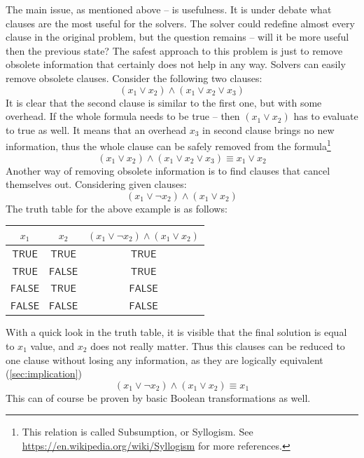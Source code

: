 \documentclass[12pt,english,pdflatex]{aghdpl}
\begin{document}
The main issue, as mentioned above -- is usefulness. It is under debate
what clauses are the most useful for the solvers. The solver could redefine
almost every clause in the original problem, but the question remains
-- will it be more useful then the previous state? The safest approach
to this problem is just to remove obsolete information that certainly
does not help in any way. Solvers can easily remove obsolete clauses.
Consider the following two clauses:
\begin{equation}
(x_1 \vee x_2)\wedge(x_1\vee x_2\vee x_3)
\end{equation}
It is clear that the second clause is similar to the first one, but with some
overhead. If the whole formula needs to be true -- then $(x_1 \vee x_2)$ has to evaluate to true as well. It means that an overhead $x_3$ in second clause brings no new information,
thus the whole clause can be safely removed from the formula\footnote{This relation is called Subsumption, or Syllogism. See \url{https://en.wikipedia.org/wiki/Syllogism} for more references.}
\begin{equation}
(x_1 \vee x_2)\wedge(x_1\vee x_2\vee x_3)\equiv x_1 \vee x_2
\end{equation}
Another way of removing obsolete information is to find clauses that
cancel themselves out. Considering given clauses:
\begin{equation}
(x_1 \vee \neg x_2)\wedge(x_1\vee x_2)
\end{equation}
The truth table for the above example is as follows:
\begin{center}
\setlength{\tabcolsep}{6pt}
\begin{tabular}{ccc}
  $x_{1}$ & $x_{2}$ & $(x_1 \vee \neg x_2)\wedge(x_1\vee x_2)$ \\
\hline\hline
  $\mathsf{TRUE}$   &   $\mathsf{TRUE}$  &  $\mathsf{TRUE}$  \\
  $\mathsf{TRUE}$   &   $\mathsf{FALSE}$ &  $\mathsf{TRUE}$  \\
  $\mathsf{FALSE}$  &   $\mathsf{TRUE}$  &  $\mathsf{FALSE}$ \\
  $\mathsf{FALSE}$  &   $\mathsf{FALSE}$ &  $\mathsf{FALSE}$
\end{tabular}
\end{center}
With a quick look in the truth table, it is visible that
the final solution is equal to $x_1$ value, and $x_2$ does not really matter.
Thus this clauses can be reduced to one clause
without losing any information, as they are logically equivalent (\ref{sec:implication})
\begin{equation}
(x_1 \vee \neg x_2)\wedge(x_1\vee x_2) \equiv x_1
\end{equation}
This can of course be proven by basic Boolean transformations as well.
\end{document}
